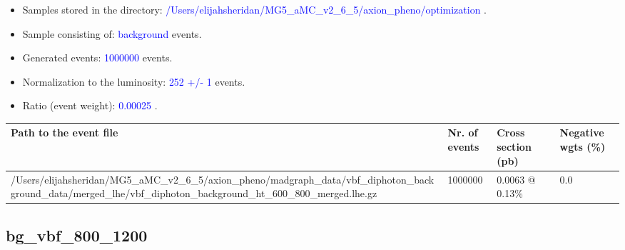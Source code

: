 \documentclass[a4paper, 10pt]{article}
\begin{document}
\begin{itemize}
  \item Samples stored in the directory: \textcolor{blue}{/\-Users/\-elijahsheridan/\-MG5\_aMC\_v2\_6\_5/\-axion\_pheno/\-optimization} .
   \item Sample consisting of: \textcolor{blue}{background}  events.
   \item Generated events: \textcolor{blue}{1000000 }  events.
   \item Normalization to the luminosity: \textcolor{blue}{252}\textcolor{blue}{ +/\-- }\textcolor{blue}{1 }  events.
   \item Ratio (event weight): \textcolor{blue}{0.00025 } .  
 
\end{itemize}
\begin{table}[H]
  \begin{center}
    \begin{tabular}{|m{55.0mm}|m{25.0mm}|m{30.0mm}|m{30.0mm}|}
      \hline
      {\cellcolor{yellow}         Path to the event file}& {\cellcolor{yellow}         Nr. of events}& {\cellcolor{yellow}         Cross section (pb)}& {\cellcolor{yellow}         Negative wgts (\%)}\\
      \hline
      {\cellcolor{white}          /\-Users/\-elijahsheridan/\-MG5\_aMC\_v2\_6\_5/\-axion\_pheno/\-madgraph\_data/\-vbf\_diphoton\_background\_data/\-merged\_lhe/\-vbf\_diphoton\_background\_ht\_600\_800\_merged.lhe.gz}& {\cellcolor{white}          1000000}& {\cellcolor{white}          0.0063 @ 0.13\%}& {\cellcolor{white}          0.0}\\
\hline
    \end{tabular}
  \end{center}
\end{table}

\subsection{ bg\_vbf\_800\_1200}
\end{document}
